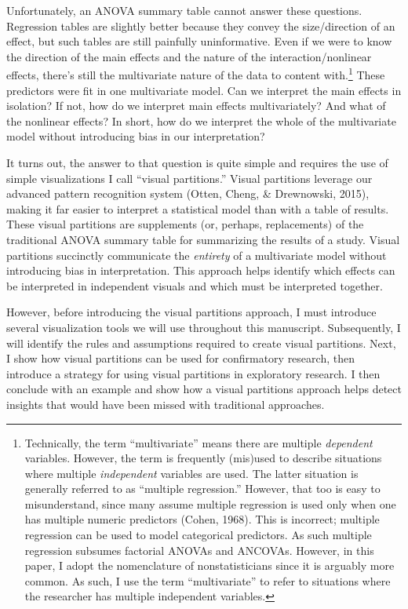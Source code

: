 \documentclass[
  man,floatsintext]{apa6}
\begin{document}
Unfortunately, an ANOVA summary table cannot answer these questions. Regression tables are slightly better because they convey the size/direction of an effect, but such tables are still painfully uninformative. Even if we were to know the direction of the main effects and the nature of the interaction/nonlinear effects, there's still the multivariate nature of the data to content with.\footnote{Technically, the term ``multivariate'' means there are multiple \emph{dependent} variables. However, the term is frequently (mis)used to describe situations where multiple \emph{independent} variables are used. The latter situation is generally referred to as ``multiple regression.'' However, that too is easy to misunderstand, since many assume multiple regression is used only when one has multiple numeric predictors (Cohen, 1968). This is incorrect; multiple regression can be used to model categorical predictors. As such multiple regression subsumes factorial ANOVAs and ANCOVAs. However, in this paper, I adopt the nomenclature of nonstatisticians since it is arguably more common. As such, I use the term ``multivariate'' to refer to situations where the researcher has multiple independent variables.} These predictors were fit in one multivariate model. Can we interpret the main effects in isolation? If not, how do we interpret main effects multivariately? And what of the nonlinear effects? In short, how do we interpret the whole of the multivariate model without introducing bias in our interpretation?

It turns out, the answer to that question is quite simple and requires the use of simple visualizations I call ``visual partitions.'' Visual partitions leverage our advanced pattern recognition system (Otten, Cheng, \& Drewnowski, 2015), making it far easier to interpret a statistical model than with a table of results. These visual partitions are supplements (or, perhaps, replacements) of the traditional ANOVA summary table for summarizing the results of a study. Visual partitions succinctly communicate the \emph{entirety} of a multivariate model without introducing bias in interpretation. This approach helps identify which effects can be interpreted in independent visuals and which must be interpreted together.

However, before introducing the visual partitions approach, I must introduce several visualization tools we will use throughout this manuscript. Subsequently, I will identify the rules and assumptions required to create visual partitions. Next, I show how visual partitions can be used for confirmatory research, then introduce a strategy for using visual partitions in exploratory research. I then conclude with an example and show how a visual partitions approach helps detect insights that would have been missed with traditional approaches.
\end{document}

